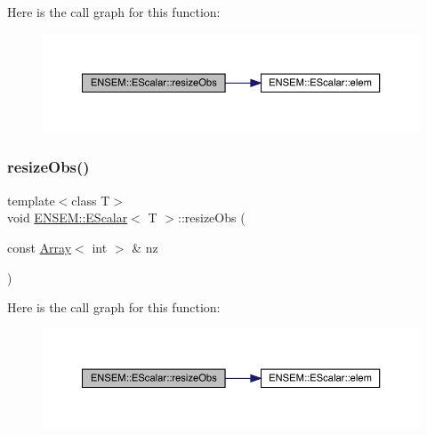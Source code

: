 Here is the call graph for this function\+:
\nopagebreak
\begin{figure}[H]
\begin{center}
\leavevmode
\includegraphics[width=350pt]{d0/d82/classENSEM_1_1EScalar_a1849b1cf66ab1a983ca9e1f268afd109_cgraph}
\end{center}
\end{figure}
\mbox{\label{classENSEM_1_1EScalar_a9273a529024099effecf6962eafa044e}} 
\subsubsection{\texorpdfstring{resizeObs()}{resizeObs()}\hspace{0.1cm}{\footnotesize\ttfamily [7/8]}}
{\footnotesize\ttfamily template$<$class T$>$ \\
void \mbox{\hyperlink{classENSEM_1_1EScalar}{E\+N\+S\+E\+M\+::\+E\+Scalar}}$<$ T $>$\+::resize\+Obs (\begin{DoxyParamCaption}\item[{const \mbox{\hyperlink{classXMLArray_1_1Array}{Array}}$<$ int $>$ \&}]{nz }\end{DoxyParamCaption})\hspace{0.3cm}{\ttfamily [inline]}}

Here is the call graph for this function\+:
\nopagebreak
\begin{figure}[H]
\begin{center}
\leavevmode
\includegraphics[width=350pt]{d0/d82/classENSEM_1_1EScalar_a9273a529024099effecf6962eafa044e_cgraph}
\end{center}
\end{figure}
\mbox{\label{classENSEM_1_1EScalar_a9273a529024099effecf6962eafa044e}} 
